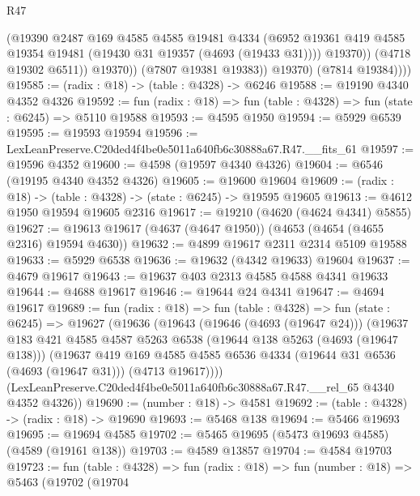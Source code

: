 \begin{lexlean}{R47}
\begin{coremodule}
                      (@19390
                        @2487
                        @169
                        @4585
                        @4585
                        @19481
                        @4334
                        (@6952
                          @19361
                          @419
                          @4585
                          @19354
                          @19481
                          (@19430 @31 @19357 (@4693 (@19433 @31))))
                        @19370))
                    (@4718 @19302 @6511))
                  @19370))
              (@7807 @19381 @19383))
            @19370)
          (@7814 @19384))))
@19585 := (radix : @18) -> (table : @4328) -> @6246
@19588 := @19190 @4340 @4352 @4326
@19592 := fun (radix : @18) => fun (table : @4328) => fun (state : @6245) => @5110 @19588
@19593 := @4595 @1950
@19594 := @5929 @6539
@19595 := @19593 @19594
@19596 := LexLeanPreserve.C20ded4f4be0e5011a640fb6c30888a67.R47.__fits_61
@19597 := @19596 @4352
@19600 := @4598 (@19597 @4340 @4326)
@19604 := @6546 (@19195 @4340 @4352 @4326)
@19605 := @19600 @19604
@19609 := (radix : @18) -> (table : @4328) -> (state : @6245) -> @19595 @19605
@19613 := @4612 @1950 @19594 @19605 @2316
@19617 := @19210 (@4620 (@4624 @4341) @5855)
@19627 := @19613 @19617 (@4637 (@4647 @1950)) (@4653 (@4654 (@4655 @2316) @19594 @4630))
@19632 := @4899 @19617 @2311 @2314 @5109 @19588
@19633 := @5929 @6538
@19636 := @19632 (@4342 @19633) @19604
@19637 := @4679 @19617
@19643 := @19637 @403 @2313 @4585 @4588 @4341 @19633
@19644 := @4688 @19617
@19646 := @19644 @24 @4341
@19647 := @4694 @19617
@19689 := fun (radix : @18) =>
  fun (table : @4328) =>
  fun (state : @6245) =>
  @19627
    (@19636
      (@19643
        (@19646 (@4693 (@19647 @24)))
        (@19637
          @183
          @421
          @4585
          @4587
          @5263
          @6538
          (@19644 @138 @5263 (@4693 (@19647 @138)))
          (@19637
            @419
            @169
            @4585
            @4585
            @6536
            @4334
            (@19644 @31 @6536 (@4693 (@19647 @31)))
            (@4713 @19617))))
      (LexLeanPreserve.C20ded4f4be0e5011a640fb6c30888a67.R47.__rel_65 @4340 @4352 @4326))
@19690 := (number : @18) -> @4581
@19692 := (table : @4328) -> (radix : @18) -> @19690
@19693 := @5468 @138
@19694 := @5466 @19693
@19695 := @19694 @4585
@19702 := @5465 @19695 (@5473 @19693 @4585) (@4589 (@19161 @138))
@19703 := @4589 @13857
@19704 := @4584 @19703
@19723 := fun (table : @4328) =>
  fun (radix : @18) =>
  fun (number : @18) =>
  @5463
    (@19702
      (@19704

\end{coremodule}
\end{lexlean}
